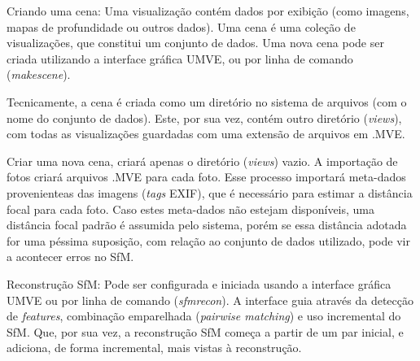 Criando uma cena: Uma visualização contém dados por exibição (como imagens, mapas de profundidade ou outros dados). Uma cena é uma coleção de visualizações, que constitui um conjunto de dados. Uma nova cena pode ser criada utilizando a interface gráfica UMVE, ou por linha de comando ({\it makescene}). 

Tecnicamente, a cena é criada como um diretório no sistema de arquivos (com o nome do conjunto de dados). Este, por sua vez, contém outro diretório ({\it views}), com todas as visualizações guardadas com uma extensão de arquivos em .MVE.

Criar uma nova cena, criará apenas o diretório ({\it views}) vazio. A importação de fotos criará arquivos .MVE para cada foto. Esse processo importará meta-dados provenienteas das imagens ({\it tags} EXIF), que é necessário para estimar a distância focal para cada foto. Caso estes meta-dados não estejam disponíveis, uma distância focal padrão é assumida pelo sistema, porém se essa distância adotada for uma péssima suposição, com relação ao conjunto de dados utilizado, pode vir a acontecer erros no SfM.



Reconstrução SfM: Pode ser configurada e iniciada usando a interface gráfica UMVE ou por linha de comando ({\it sfmrecon}). A interface guia através da detecção de {\it features}, combinação emparelhada ({\it pairwise matching}) e uso incremental do SfM. Que, por sua vez, a reconstrução SfM começa a partir de um par inicial, e adiciona, de forma incremental, mais vistas à reconstrução.


